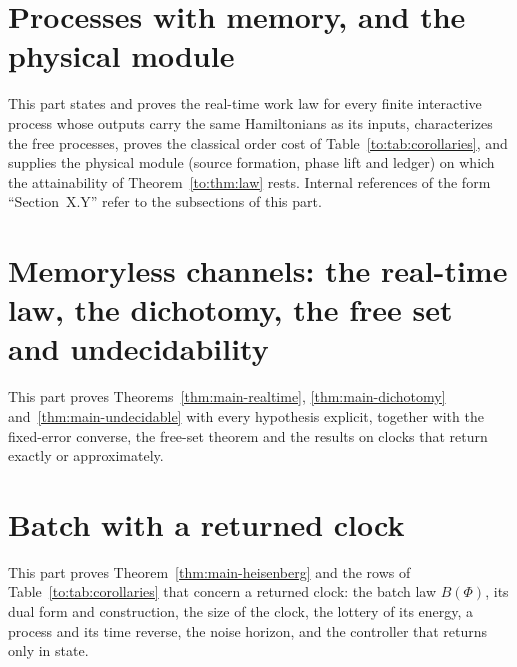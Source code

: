 













\appendix
\clearpage



\clearpage
\section{Processes with memory, and the physical module}\label{app:module}
This part states and proves the real-time work law for every finite interactive process whose outputs carry the same Hamiltonians as its inputs, characterizes the free processes, proves the classical order cost of Table~\ref{to:tab:corollaries}, and supplies the physical module (source formation, phase lift and ledger) on which the attainability of Theorem~\ref{to:thm:law} rests. Internal references of the form ``Section~X.Y'' refer to the subsections of this part.




\clearpage
\section{Memoryless channels: the real-time law, the dichotomy, the free set and undecidability}\label{app:channels}
This part proves Theorems~\ref{thm:main-realtime}, \ref{thm:main-dichotomy} and~\ref{thm:main-undecidable} with every hypothesis explicit, together with the fixed-error converse, the free-set theorem and the results on clocks that return exactly or approximately.






\clearpage
\renewcommand{\D}{\mathsf D}
\section{Batch with a returned clock}\label{app:batch}
This part proves Theorem~\ref{thm:main-heisenberg} and the rows of Table~\ref{to:tab:corollaries} that concern a returned clock: the batch law $B(\Phi)$, its dual form and construction, the size of the clock, the lottery of its energy, a process and its time reverse, the noise horizon, and the controller that returns only in state.



